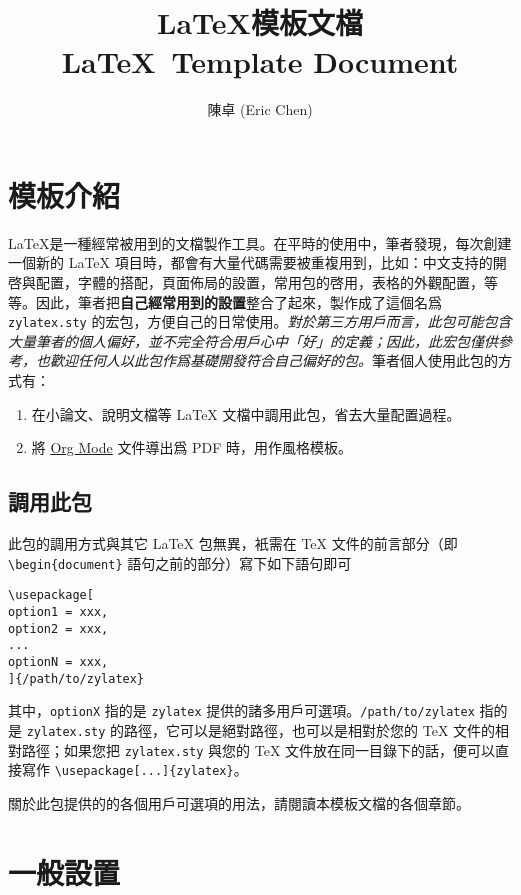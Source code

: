 \documentclass[
oneside,
12pt,
]{book}
\title{
  \Huge \LaTeX 模板文檔 \\
  \Large \LaTeX\ Template Document
}
\author{
  陳卓 (Eric Chen)
}
\date{\DTMtoday}
\begin{document}
\maketitle

\tableofcontents

\chapter{模板介紹}

\LaTeX 是一種經常被用到的文檔製作工具。在平時的使用中，筆者發現，每次創建一個新的 LaTeX 項目時，都會有大量代碼需要被重複用到，比如：中文支持的開啓與配置，字體的搭配，頁面佈局的設置，常用包的啓用，表格的外觀配置，等等。因此，筆者把\textbf{自己經常用到的設置}整合了起來，製作成了這個名爲 \texttt{zylatex.sty} 的宏包，方便自己的日常使用。\textit{對於第三方用戶而言，此包可能包含大量筆者的個人偏好，並不完全符合用戶心中「好」的定義；因此，此宏包僅供參考，也歡迎任何人以此包作爲基礎開發符合自己偏好的包。}筆者個人使用此包的方式有：

\begin{enumerate}
\item 在小論文、說明文檔等 LaTeX 文檔中調用此包，省去大量配置過程。
\item 將 \href{https://orgmode.org/}{Org Mode} 文件導出爲 PDF 時，用作風格模板。
\end{enumerate}

\section{調用此包}

此包的調用方式與其它 LaTeX 包無異，衹需在 TeX 文件的前言部分（即 \texttt{\textbackslash begin\{document\}} 語句之前的部分）寫下如下語句即可

\begin{verbatim}
\usepackage[
option1 = xxx,
option2 = xxx,
...
optionN = xxx,
]{/path/to/zylatex}
\end{verbatim}

其中，\texttt{optionX} 指的是 \texttt{zylatex} 提供的諸多用戶可選項。\texttt{/path/to/zylatex} 指的是 \texttt{zylatex.sty} 的路徑，它可以是絕對路徑，也可以是相對於您的 TeX 文件的相對路徑；如果您把 \texttt{zylatex.sty} 與您的 TeX 文件放在同一目錄下的話，便可以直接寫作 \texttt{\textbackslash usepackage[...]\{zylatex\}}。

關於此包提供的的各個用戶可選項的用法，請閱讀本模板文檔的各個章節。

\chapter{一般設置}
\end{document}
